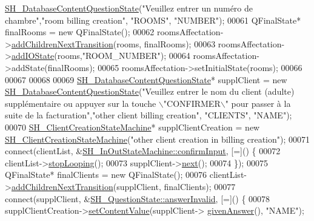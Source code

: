 \begin{DoxyCode}
      \hyperlink{classSH__DatabaseContentQuestionState}{SH\_DatabaseContentQuestionState}(\textcolor{stringliteral}{"Veuillez entrer un numéro de chambre"},\textcolor{stringliteral}{"room
       billing creation"}, \textcolor{stringliteral}{"ROOMS"}, \textcolor{stringliteral}{"NUMBER"});
00061     QFinalState* finalRooms = \textcolor{keyword}{new} QFinalState();
00062     roomsAffectation->\hyperlink{classSh__LoopingInOutStateMachine_acfd8d0711c793b13c759f6c50be6a315}{addChildrenNextTransition}(rooms, finalRooms);
00063     roomsAffectation->\hyperlink{classSH__InOutStateMachine_ad6b778d052f741daee720c047059ce0e}{addIOState}(rooms,\textcolor{stringliteral}{"ROOM\_NUMBER"});
00064     roomsAffectation->addState(finalRooms);
00065     roomsAffectation->setInitialState(rooms);
00066 
00067 
00068 
00069     \hyperlink{classSH__DatabaseContentQuestionState}{SH\_DatabaseContentQuestionState}* supplClient = \textcolor{keyword}{new} 
      \hyperlink{classSH__DatabaseContentQuestionState}{SH\_DatabaseContentQuestionState}(\textcolor{stringliteral}{"Veuillez entrer le nom du client (adulte)
       supplémentaire ou appuyer sur la touche \(\backslash\)"CONFIRMER\(\backslash\)" pour passer à la suite de la facturation"},\textcolor{stringliteral}{"other client
       billing creation"}, \textcolor{stringliteral}{"CLIENTS"}, \textcolor{stringliteral}{"NAME"});
00070     \hyperlink{classSH__ClientCreationStateMachine}{SH\_ClientCreationStateMachine}* supplClientCreation = \textcolor{keyword}{new} 
      \hyperlink{classSH__ClientCreationStateMachine}{SH\_ClientCreationStateMachine}(\textcolor{stringliteral}{"other client creation in billing creation"});
00071     connect(clientList, &\hyperlink{classSH__InOutStateMachine_a0fb4c4d63ccb19df48f1e060d02d8ae3}{SH\_InOutStateMachine::confirmInput}, [=]() \{
00072         clientList->\hyperlink{classSh__LoopingInOutStateMachine_a8788fa9e4c3149bcf7554e2a2b960c51}{stopLooping}();
00073         supplClient->\hyperlink{classSH__GenericState_a030e67a872956135c52e6876d960a7b5}{next}();
00074     \});
00075     QFinalState* finalClients = \textcolor{keyword}{new} QFinalState();
00076     clientList->\hyperlink{classSh__LoopingInOutStateMachine_acfd8d0711c793b13c759f6c50be6a315}{addChildrenNextTransition}(supplClient, finalClients);
00077     connect(supplClient, &\hyperlink{classSH__QuestionState_a3348a8a683130678ac87a10ba2a25486}{SH\_QuestionState::answerInvalid}, [=]() \{
00078         supplClientCreation->\hyperlink{classSH__InOutStateMachine_aa2766b7a7ba39c35a10df7fc0c151b4f}{setContentValue}(supplClient->
      \hyperlink{classSH__QuestionState_abde97c61175be95358ece622fd16593e}{givenAnswer}(), \textcolor{stringliteral}{"NAME"});

\end{DoxyCode}
